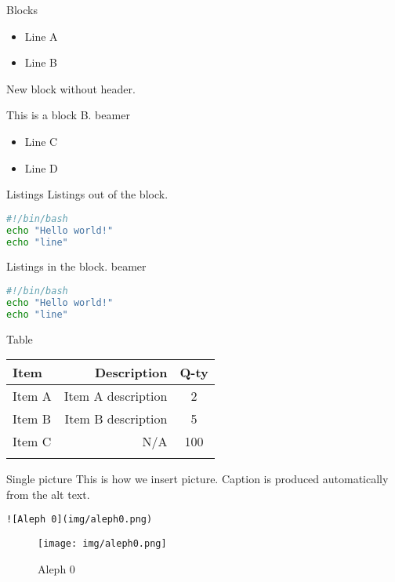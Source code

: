 \documentclass[
  11pt,
  ignorenonframetext,
  aspectratio=169,
  aspectratio=169]{beamer}
\providecommand{\tightlist}{%
  \setlength{\itemsep}{0pt}\setlength{\parskip}{0pt}}
\begin{document}
\begin{frame}{Blocks}
\label{blocks}
\begin{itemize}
\tightlist
\item
  Line A
\item
  Line B
\end{itemize}

New block without header.

\begin{block}{This is a block B. beamer}
\label{this-is-a-block-b.-beamer}
\begin{itemize}
\tightlist
\item
  Line C
\item
  Line D
\end{itemize}
\end{block}
\end{frame}

\begin{frame}[fragile]{Listings}
\label{listings}
Listings out of the block.

\begin{lstlisting}[language=sh]
#!/bin/bash
echo "Hello world!"
echo "line"
\end{lstlisting}

\begin{block}{Listings in the block. beamer}
\label{listings-in-the-block.-beamer}
\begin{lstlisting}[language=sh]
#!/bin/bash
echo "Hello world!"
echo "line"
\end{lstlisting}
\end{block}
\end{frame}

\begin{frame}{Table}
\label{table}
\begin{longtable}[]{@{}lrc@{}}
\toprule\noalign{}
\textbf{Item} & \textbf{Description} & \textbf{Q-ty} \\
\midrule\noalign{}
\endhead
Item A & Item A description & 2 \\
Item B & Item B description & 5 \\
Item C & N/A & 100 \\
\bottomrule\noalign{}
\end{longtable}
\end{frame}

\begin{frame}[fragile]{Single picture}
\label{single-picture}
This is how we insert picture. Caption is produced automatically from
the alt text.

\begin{lstlisting}
![Aleph 0](img/aleph0.png) 
\end{lstlisting}

\begin{figure}
\centering
\texttt{[image: img/aleph0.png]}
\caption{Aleph 0}
\end{figure}
\end{frame}
\end{document}
